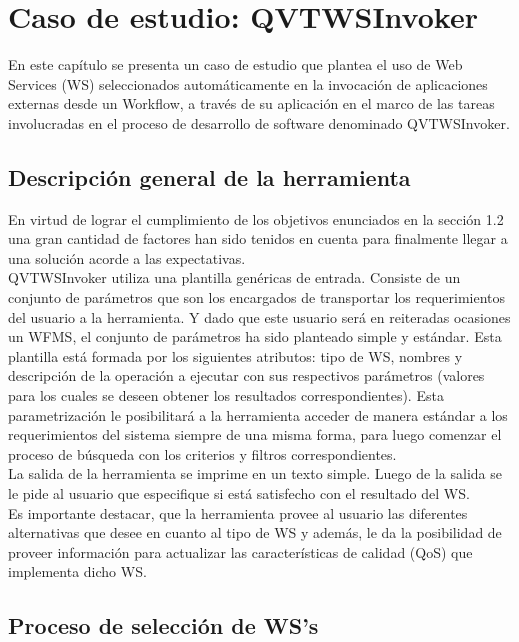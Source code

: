\chapter{Caso de estudio: QVTWSInvoker}
\label{Caso de estudio: QVTWSInvoker}

En este capítulo se presenta un caso de estudio que plantea el uso de Web Services (WS) seleccionados automáticamente en la invocación de aplicaciones externas desde un Workflow, a través de su aplicación en el marco de las tareas involucradas en el proceso de desarrollo de software denominado QVTWSInvoker.


\section{Descripción general de la herramienta}

En virtud de lograr el cumplimiento de los objetivos enunciados en la sección 1.2 una gran cantidad de factores han sido tenidos en cuenta para finalmente llegar a una solución acorde a las expectativas.\\
QVTWSInvoker utiliza una plantilla genéricas de entrada. Consiste de un conjunto de parámetros que son los encargados de transportar los requerimientos del usuario a la herramienta. Y dado que este usuario será en reiteradas ocasiones un WFMS, el conjunto de parámetros ha sido planteado simple y estándar. Esta plantilla está formada por los siguientes atributos: tipo de WS, nombres y descripción de la operación a ejecutar con sus respectivos parámetros (valores para los cuales se deseen obtener los resultados correspondientes). Esta parametrización le posibilitará a la herramienta acceder de manera estándar a los requerimientos del sistema siempre de una misma forma, para luego comenzar el proceso de búsqueda con los criterios y filtros correspondientes.\\
La salida de la herramienta se imprime en un texto simple. Luego de la salida se le pide al usuario que especifique si está satisfecho con el resultado del WS.\\
Es importante destacar, que la herramienta provee al usuario las diferentes alternativas que desee en cuanto al tipo de WS y además, le da la posibilidad de proveer información para actualizar las características de calidad (QoS) que implementa dicho WS. 

\section{Proceso de selección de WS's}

